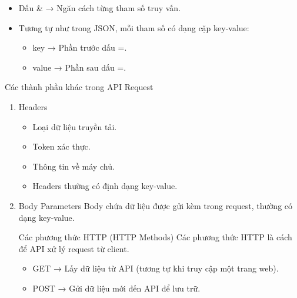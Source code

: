 \begin{enumerate}
\begin{tcolorbox}[title=Chúng được xác định bởi hai dấu phân cách:]
\begin{itemize}
    \item Dấu \& → Ngăn cách từng tham số truy vấn.

    \item Tương tự như trong JSON, mỗi tham số có dạng cặp key-value:
    \begin{itemize}
        \item key → Phần trước dấu =.

       \item value → Phần sau dấu =.
    \end{itemize}

\end{itemize}
\end{tcolorbox}


Các thành phần khác trong API Request
\begin{enumerate}
    \item Headers



\begin{tcolorbox}[title=Headers chứa metadata về request API chẳng hạn như:]
\begin{itemize}
    \item Loại dữ liệu truyền tải.

    \item Token xác thực.

    \item Thông tin về máy chủ.

    \item Headers thường có định dạng key-value.
\end{itemize}
\end{tcolorbox}



    \item Body Parameters
Body chứa dữ liệu được gửi kèm trong request, thường có dạng key-value.

Các phương thức HTTP (HTTP Methods)
Các phương thức HTTP là cách để API xử lý request từ client.


\begin{tcolorbox}[title=Dưới đây là một số phương thức phổ biến:]
\begin{itemize}
    \item GET → Lấy dữ liệu từ API (tương tự khi truy cập một trang web).

    \item POST → Gửi dữ liệu mới đến API để lưu trữ.


\end{itemize}
\end{tcolorbox}
\end{enumerate}
\end{enumerate}
